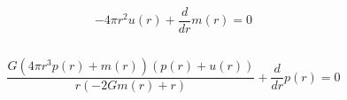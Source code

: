 \documentclass[11pt]{article}
\begin{document}
    $$- 4 \pi r^{2} u{\left(r \right)} + \frac{d}{d r} m{\left(r \right)}=0$$

    
    \begin{Verbatim}[commandchars=\\\{\}]

    \end{Verbatim}

    $$\frac{G \left(4 \pi r^{3} p{\left(r \right)} + m{\left(r \right)}\right) \left(p{\left(r \right)} + u{\left(r \right)}\right)}{r \left(- 2 G m{\left(r \right)} + r\right)} + \frac{d}{d r} p{\left(r \right)}=0$$

    

    
    
    
\end{document}
